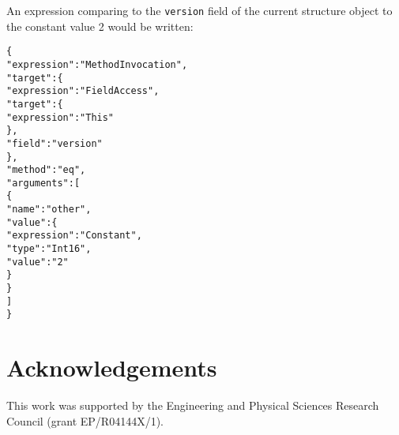 \documentclass[10pt,twocolumn,a4paper]{article}
\newcommand{\code}[1]{\texttt{#1}}
\begin{document}
An expression comparing to the \code{version} field of the current
structure object to the constant value 2 would be written:
\footnotesize
\begin{alltt}
  \{
     "expression" : "MethodInvocation",
     "target"     : \{
       "expression" : "FieldAccess",
       "target" : \{
         "expression" : "This"
       \},
       "field"    : "version"
     \},
     "method"     : "eq",
     "arguments"  : [
       \{
         "name"  : "other",
         "value" : \{
           "expression" : "Constant",
           "type"       : "Int16",
           "value"      : "2"
         \}
       \}
     ]
  \}
\end{alltt}
\normalsize

\section{Acknowledgements}

This work was supported by the Engineering and Physical Sciences Research
Council (grant EP/R04144X/1).



\ifpdf
  \ifdefined\pdftrailerid
    \pdftrailerid{}
  \fi
\fi
\end{document}
